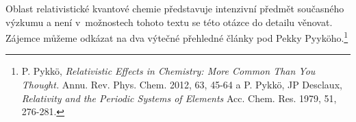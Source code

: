 Oblast relativistické kvantové chemie představuje intenzivní předmět současného výzkumu a není v~možnostech tohoto textu se této otázce do detailu věnovat. Zájemce můžeme odkázat na dva výtečné přehledné články pod Pekky Pyyk\"oho.\footnote{P. Pykk\"o, \textit{Relativistic Effects in Chemistry: More Common Than You Thought.} Annu. Rev. Phys. Chem. 2012, 63, 45-64 a P. Pykk\"o, JP Desclaux, \textit{Relativity and the Periodic Systems of Elements} Acc. Chem. Res. 1979, 51, 276-281.}



      

   




 




      

      



